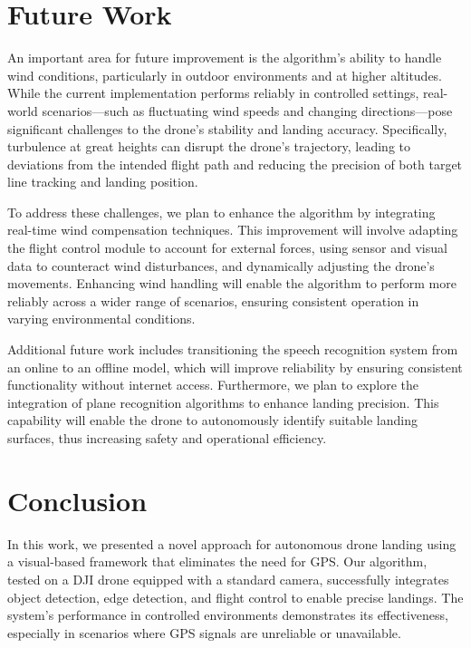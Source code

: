 \documentclass[3p,times]{elsarticle}
\begin{document}
\newpage \section{Future Work} \label{sec:future}
An important area for future improvement is the algorithm's ability to handle wind conditions, particularly in outdoor environments and at higher altitudes. While the current implementation performs reliably in controlled settings, real-world scenarios—such as fluctuating wind speeds and changing directions—pose significant challenges to the drone's stability and landing accuracy. Specifically, turbulence at great heights can disrupt the drone's trajectory, leading to deviations from the intended flight path and reducing the precision of both target line tracking and landing position.

To address these challenges, we plan to enhance the algorithm by integrating real-time wind compensation techniques. This improvement will involve adapting the flight control module to account for external forces, using sensor and visual data to counteract wind disturbances, and dynamically adjusting the drone's movements. Enhancing wind handling will enable the algorithm to perform more reliably across a wider range of scenarios, ensuring consistent operation in varying environmental conditions.

Additional future work includes transitioning the speech recognition system from an online to an offline model, which will improve reliability by ensuring consistent functionality without internet access. Furthermore, we plan to explore the integration of plane recognition algorithms to enhance landing precision. This capability will enable the drone to autonomously identify suitable landing surfaces, thus increasing safety and operational efficiency.

\section{Conclusion}
In this work, we presented a novel approach for autonomous drone landing using a visual-based framework that eliminates the need for GPS. Our algorithm, tested on a DJI drone equipped with a standard camera, successfully integrates object detection, edge detection, and flight control to enable precise landings. The system's performance in controlled environments demonstrates its effectiveness, especially in scenarios where GPS signals are unreliable or unavailable.\\
\end{document}

